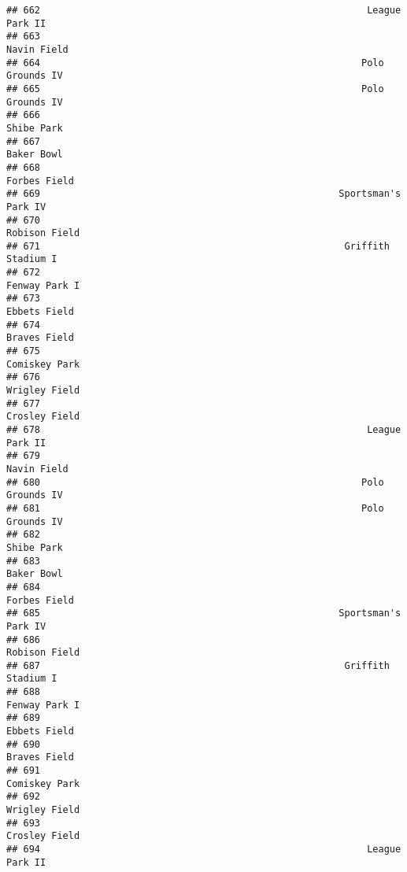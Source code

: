 \documentclass[]{article}
\begin{document}
\begin{verbatim}
## 662                                                          League Park II
## 663                                                             Navin Field
## 664                                                         Polo Grounds IV
## 665                                                         Polo Grounds IV
## 666                                                              Shibe Park
## 667                                                              Baker Bowl
## 668                                                            Forbes Field
## 669                                                     Sportsman's Park IV
## 670                                                           Robison Field
## 671                                                      Griffith Stadium I
## 672                                                           Fenway Park I
## 673                                                            Ebbets Field
## 674                                                            Braves Field
## 675                                                           Comiskey Park
## 676                                                           Wrigley Field
## 677                                                           Crosley Field
## 678                                                          League Park II
## 679                                                             Navin Field
## 680                                                         Polo Grounds IV
## 681                                                         Polo Grounds IV
## 682                                                              Shibe Park
## 683                                                              Baker Bowl
## 684                                                            Forbes Field
## 685                                                     Sportsman's Park IV
## 686                                                           Robison Field
## 687                                                      Griffith Stadium I
## 688                                                           Fenway Park I
## 689                                                            Ebbets Field
## 690                                                            Braves Field
## 691                                                           Comiskey Park
## 692                                                           Wrigley Field
## 693                                                           Crosley Field
## 694                                                          League Park II

\end{verbatim}
\end{document}
